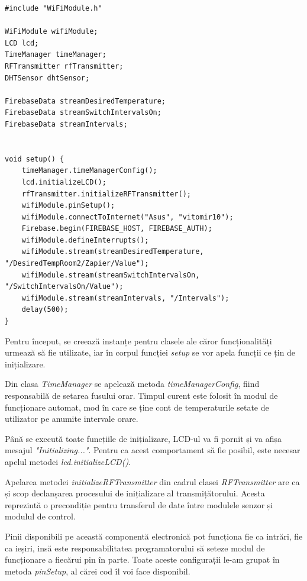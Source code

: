 \vspace{1em}

\begin{lstlisting}
#include "WiFiModule.h"

WiFiModule wifiModule;
LCD lcd;
TimeManager timeManager;
RFTransmitter rfTransmitter;
DHTSensor dhtSensor;

FirebaseData streamDesiredTemperature;
FirebaseData streamSwitchIntervalsOn;
FirebaseData streamIntervals;


void setup() {
    timeManager.timeManagerConfig();
    lcd.initializeLCD();
    rfTransmitter.initializeRFTransmitter();
    wifiModule.pinSetup();
    wifiModule.connectToInternet("Asus", "vitomir10");
    Firebase.begin(FIREBASE_HOST, FIREBASE_AUTH);
    wifiModule.defineInterrupts();
    wifiModule.stream(streamDesiredTemperature, "/DesiredTempRoom2/Zapier/Value");
    wifiModule.stream(streamSwitchIntervalsOn, "/SwitchIntervalsOn/Value");  
    wifiModule.stream(streamIntervals, "/Intervals");
    delay(500);
}
\end{lstlisting}

\vspace{2em}

	Pentru început, se creează instanțe pentru clasele ale căror funcționalități urmează să fie utilizate, iar în corpul funcției \textit{setup} se vor apela funcții ce țin de inițializare.

	Din clasa \textit{TimeManager} se apelează metoda \textit{timeManagerConfig}, fiind responsabilă de setarea fusului orar. Timpul curent este folosit în modul de funcționare automat, mod în care se ține cont de temperaturile setate de utilizator pe anumite intervale orare. 

	Până se execută toate funcțiile de inițializare, LCD-ul va fi pornit și va afișa mesajul \textit{"Initializing..."}. Pentru ca acest comportament să fie posibil, este necesar apelul metodei \textit{lcd.initializeLCD()}. 	

	Apelarea metodei \textit{initializeRFTransmitter} din cadrul clasei \textit{RFTransmitter} are ca și scop declanșarea procesului de inițializare al transmițătorului. Acesta reprezintă o precondiție pentru transferul de date între modulele senzor și modulul de control.

	Pinii disponibili pe această componentă electronică pot funcționa fie ca intrări, fie ca ieșiri, insă este responsabilitatea programatorului să seteze modul de funcționare a fiecărui pin în parte. Toate aceste configurații le-am grupat în metoda \textit{pinSetup}, al cărei cod îl voi face disponibil.


